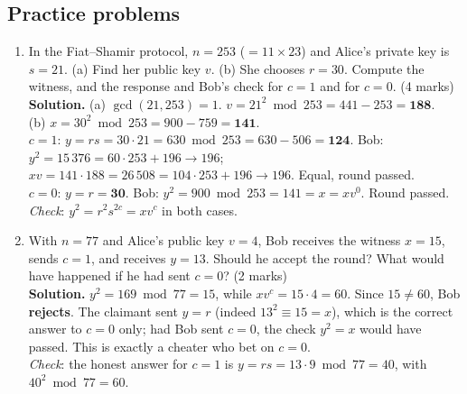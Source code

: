 \subsection*{Practice problems}
\begin{enumerate}[leftmargin=1.6em,itemsep=4pt]
  \item In the Fiat--Shamir protocol, $n = 253$ ($= 11 \times 23$) and Alice's private key is $s = 21$. (a) Find her public key $v$. (b) She chooses $r = 30$. Compute the witness, and the response and Bob's check for $c = 1$ and for $c = 0$. \hfill (4 marks)\\
  \textbf{Solution.} (a) $\gcd(21, 253) = 1$. $v = 21^2 \bmod 253 = 441 - 253 = \mathbf{188}$.\\
  (b) $x = 30^2 \bmod 253 = 900 - 759 = \mathbf{141}$.\\
  $c = 1$: $y = r s = 30 \cdot 21 = 630 \bmod 253 = 630 - 506 = \mathbf{124}$. Bob: $y^2 = 15\,376 = 60 \cdot 253 + 196 \to 196$; $x v = 141 \cdot 188 = 26\,508 = 104 \cdot 253 + 196 \to 196$. Equal, round passed.\\
  $c = 0$: $y = r = \mathbf{30}$. Bob: $y^2 = 900 \bmod 253 = 141 = x = x v^0$. Round passed.\\
  \emph{Check}: $y^2 = r^2 s^{2c} = x v^c$ in both cases.

  \item With $n = 77$ and Alice's public key $v = 4$, Bob receives the witness $x = 15$, sends $c = 1$, and receives $y = 13$. Should he accept the round? What would have happened if he had sent $c = 0$? \hfill (2 marks)\\
  \textbf{Solution.} $y^2 = 169 \bmod 77 = 15$, while $x v^c = 15 \cdot 4 = 60$. Since $15 \ne 60$, Bob \textbf{rejects}. The claimant sent $y = r$ (indeed $13^2 \equiv 15 = x$), which is the correct answer to $c = 0$ only; had Bob sent $c = 0$, the check $y^2 = x$ would have passed. This is exactly a cheater who bet on $c = 0$.\\
  \emph{Check}: the honest answer for $c = 1$ is $y = rs = 13 \cdot 9 \bmod 77 = 40$, with $40^2 \bmod 77 = 60$.


\end{enumerate}

